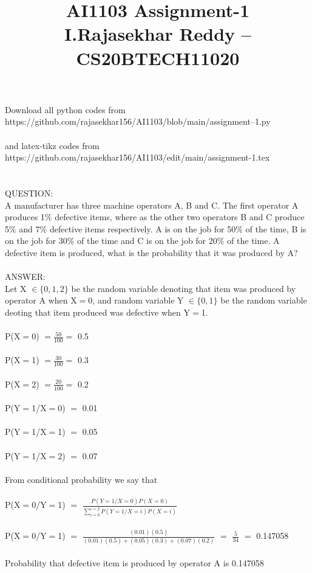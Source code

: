 \documentclass[]{article}
\title{}
\author{}
\begin{document}
\title{AI1103 Assignment-1 \\I.Rajasekhar Reddy -- CS20BTECH11020}
\maketitle
Download all python codes from \\
https://github.com/rajasekhar156/AI1103/blob/main/assignment--1.py\\ \\
and latex-tikz codes from \\
https://github.com/rajasekhar156/AI1103/edit/main/assignment-1.tex\\ \\ \\



QUESTION:\\
A manufacturer has three machine operators A, B and C. The first operator A produces 1$\%$ defective items, where as the other two operators B and C produce 5$\%$ and 7$\%$ defective items respectively. A is on the job
for 50$\%$ of the time, B is on the job for 30$\%$ of the time and C is on the job for 20$\%$ of the time. A defective item is produced, what
is the probability that it was produced by A$?$
\\ \\
ANSWER:\\
Let X $\in\{0,1,2\}$ be the random variable denoting that item was produced by operator A when X$=$0, and random variable Y $\in\{0,1\}$ be the random variable deoting that item produced was  defective when Y$=$1.\\ \\
	P(X$=$0) $=\frac{50}{100} =$ 0.5 \\ \\
    P(X$=$1) $=\frac{30}{100} =$ 0.3 \\ \\ 
    P(X$=$2) $=\frac{20}{100} =$ 0.2 \\ \\	
	P(Y$=$1/X$=$0) $=$ 0.01\\ \\
	P(Y$=$1/X$=$1) $=$ 0.05\\ \\
	P(Y$=$1/X$=$2) $=$ 0.07\\ \\
	From conditional probability we say that \\ \\
	P(X$=$0/Y$=$1) $=$ $\frac{P(Y=1/X=0)P(X=0)}{\sum_{i=0}^{i=2}P(Y=1/X=i)P(X=i)}$\\ \\ 
	P(X$=$0/Y$=$1) $=$ $\frac{(0.01)(0.5)}{(0.01)(0.5)+(0.05)(0.3)+(0.07)(0.2)}$ $=$ $\frac{5}{34}$ $=$ 0.147058\\ \\
	Probability that defective item is produced by operator A is 0.147058
	
\end{document}
